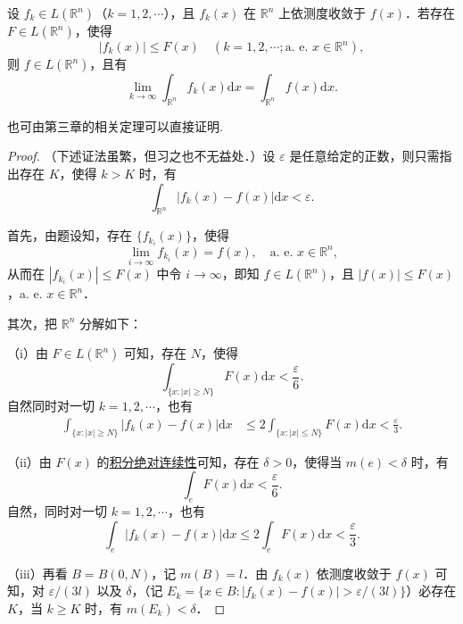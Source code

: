 \documentclass[../../main.tex]{subfiles}
\begin{document}
\begin{theorem}[依测度收敛型控制收敛定理]\label{theorem:依测度收敛型控制收敛定理}
设 \( f_k \in L(\mathbb{R}^n) \)（\( k = 1,2,\cdots \)），且 \( f_k(x) \) 在 \( \mathbb{R}^n \) 上依测度收敛于 \( f(x) \)．若存在 \( F \in L(\mathbb{R}^n) \)，使得
\[
|f_k(x)| \leqslant F(x) \quad (k = 1,2,\cdots; \text{a. e. } x \in \mathbb{R}^n),
\]
则 \( f \in L(\mathbb{R}^n) \)，且有
\[
\lim_{k \to \infty} \int_{\mathbb{R}^n} f_k(x) \mathrm{d}x = \int_{\mathbb{R}^n} f(x) \mathrm{d}x.
\]
\end{theorem}
\begin{remark}
也可由第三章的相关定理可以直接证明.
\end{remark}
\begin{proof}
（下述证法虽繁，但习之也不无益处．）设 \( \varepsilon \) 是任意给定的正数，则只需指出存在 \( K \)，使得 \( k > K \) 时，有
\[
\int_{\mathbb{R}^n} |f_k(x) - f(x)| \mathrm{d}x < \varepsilon.
\]

首先，由题设知，存在 \( \{ f_{k_i}(x) \} \)，使得
\[
\lim_{i \to \infty} f_{k_i}(x) = f(x), \quad \text{a. e. } x \in \mathbb{R}^n,
\]
从而在 \( |f_{k_i}(x)| \leqslant F(x) \) 中令 \( i \to \infty \)，即知 \( f \in L(\mathbb{R}^n) \)，且 \( |f(x)| \leqslant F(x) \)，a. e. \( x \in \mathbb{R}^n \)．

其次，把 \( \mathbb{R}^n \) 分解如下：

（i）由 \( F \in L(\mathbb{R}^n) \) 可知，存在 \( N \)，使得
\[
\int_{\{ x : |x| \geqslant N \}} F(x) \mathrm{d}x < \frac{\varepsilon}{6}.
\]
自然同时对一切 \( k = 1,2,\cdots \)，也有
\begin{align*}
\int_{\{ x : |x| \geqslant N \}} |f_k(x) - f(x)| \mathrm{d}x &\leqslant 2 \int_{\{ x : |x| \leqslant N \}} F(x) \mathrm{d}x < \frac{\varepsilon}{3}.
\end{align*}

（ii）由 \( F(x) \) 的\hyperref[theorem:积分的绝对连续性]{积分绝对连续性}可知，存在 \( \delta > 0 \)，使得当 \( m(e) < \delta \) 时，有
\[
\int_{e} F(x) \mathrm{d}x < \frac{\varepsilon}{6}.
\]
自然，同时对一切 \( k = 1,2,\cdots \)，也有
\[
\int_{e} |f_k(x) - f(x)| \mathrm{d}x \leqslant 2 \int_{e} F(x) \mathrm{d}x < \frac{\varepsilon}{3}.
\]

（iii）再看 \( B = B(0, N) \)，记 \( m(B) = l \)．由 \( f_k(x) \) 依测度收敛于 \( f(x) \) 可知，对 \( \varepsilon/(3l) \) 以及 \( \delta \)，（记 \( E_k = \{ x \in B : |f_k(x) - f(x)| > \varepsilon/(3l) \} \)）必存在 \( K \)，当 \( k \geqslant K \) 时，有 \( m(E_k) < \delta \)．


\end{proof}
\end{document}
